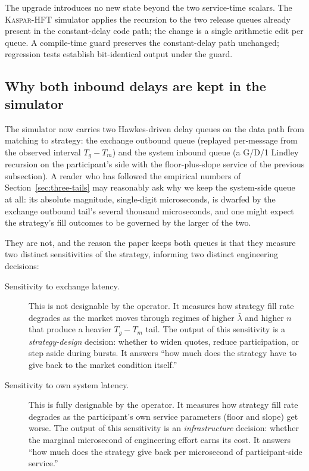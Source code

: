 \documentclass[11pt]{article}
\newcommand{\kasparhft}{\textsc{Kaspar-HFT}}
\begin{document}
The upgrade introduces no new state beyond the two service-time scalars. The \kasparhft{} simulator applies the recursion to the two release queues already present in the constant-delay code path; the change is a single arithmetic edit per queue. A compile-time guard preserves the constant-delay path unchanged; regression tests establish bit-identical output under the guard.

\subsection{Why both inbound delays are kept in the simulator}
\label{sec:upgrade-rationale}

The simulator now carries two Hawkes-driven delay queues on the data path from matching to strategy: the exchange outbound queue (replayed per-message from the observed interval $T_g - T_m$) and the system inbound queue (a G/D/1 Lindley recursion on the participant's side with the floor-plus-slope service of the previous subsection). A reader who has followed the empirical numbers of Section~\ref{sec:three-tails} may reasonably ask why we keep the system-side queue at all: its absolute magnitude, single-digit microseconds, is dwarfed by the exchange outbound tail's several thousand microseconds, and one might expect the strategy's fill outcomes to be governed by the larger of the two.

They are not, and the reason the paper keeps both queues is that they measure two distinct sensitivities of the strategy, informing two distinct engineering decisions:

\begin{description}
\item[Sensitivity to exchange latency.] This is not designable by the operator. It measures how strategy fill rate degrades as the market moves through regimes of higher $\bar\lambda$ and higher $n$ that produce a heavier $T_g - T_m$ tail. The output of this sensitivity is a \emph{strategy-design} decision: whether to widen quotes, reduce participation, or step aside during bursts. It answers ``how much does the strategy have to give back to the market condition itself.''
\item[Sensitivity to own system latency.] This is fully designable by the operator. It measures how strategy fill rate degrades as the participant's own service parameters (floor and slope) get worse. The output of this sensitivity is an \emph{infrastructure} decision: whether the marginal microsecond of engineering effort earns its cost. It answers ``how much does the strategy give back per microsecond of participant-side service.''
\end{description}
\end{document}
